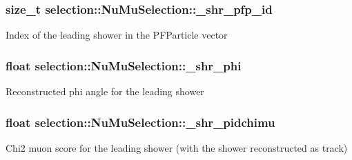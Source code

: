 \subsubsection[{\texorpdfstring{\+\_\+shr\+\_\+pfp\+\_\+id}{_shr_pfp_id}}]{\setlength{\rightskip}{0pt plus 5cm}size\+\_\+t selection\+::\+Nu\+Mu\+Selection\+::\+\_\+shr\+\_\+pfp\+\_\+id\hspace{0.3cm}{\ttfamily [private]}}\hypertarget{classselection_1_1NuMuSelection_a6a877911df0beda5d7d43149d0535389}{}\label{classselection_1_1NuMuSelection_a6a877911df0beda5d7d43149d0535389}
Index of the leading shower in the P\+F\+Particle vector 
\subsubsection[{\texorpdfstring{\+\_\+shr\+\_\+phi}{_shr_phi}}]{\setlength{\rightskip}{0pt plus 5cm}float selection\+::\+Nu\+Mu\+Selection\+::\+\_\+shr\+\_\+phi\hspace{0.3cm}{\ttfamily [private]}}\hypertarget{classselection_1_1NuMuSelection_a232af76713ec76fb68ce4e878cc3cbea}{}\label{classselection_1_1NuMuSelection_a232af76713ec76fb68ce4e878cc3cbea}
Reconstructed phi angle for the leading shower 
\subsubsection[{\texorpdfstring{\+\_\+shr\+\_\+pidchimu}{_shr_pidchimu}}]{\setlength{\rightskip}{0pt plus 5cm}float selection\+::\+Nu\+Mu\+Selection\+::\+\_\+shr\+\_\+pidchimu\hspace{0.3cm}{\ttfamily [private]}}\hypertarget{classselection_1_1NuMuSelection_aba9f56f7c16447322e3108dc91bc3ff0}{}\label{classselection_1_1NuMuSelection_aba9f56f7c16447322e3108dc91bc3ff0}
Chi2 muon score for the leading shower (with the shower reconstructed as track) 
